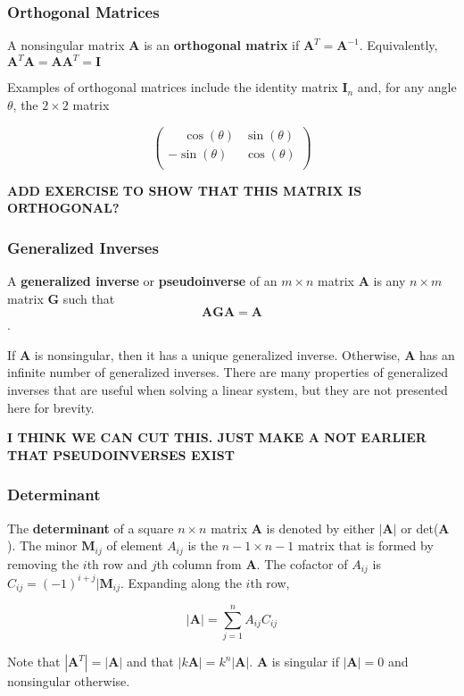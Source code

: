 \documentclass{beamer}
\begin{document}
\begin{frame}
\frametitle{Orthogonal Matrices}
A nonsingular matrix $\mathbf{A}$ is an \textbf{orthogonal matrix} if $\mathbf{A}^T = \mathbf{A}^{-1}$.  Equivalently, $\mathbf{A}^T\mathbf{A} = \mathbf{AA}^T = \mathbf{I}$   

\vspace{5mm}

Examples of orthogonal matrices include the identity matrix $\mathbf{I}_n$ and, for any angle $\theta$, the $2 \times 2$ matrix

\[
 \begin{pmatrix}
    \phantom{-}\cos (\theta) & \sin (\theta) \\
    -\sin (\theta) & \cos (\theta)  \\  
\end{pmatrix}
\]

\textbf{ADD EXERCISE TO SHOW THAT THIS MATRIX IS ORTHOGONAL?}

\end{frame}

\begin{frame}
\frametitle{Generalized Inverses}
A \textbf{generalized inverse} or \textbf{pseudoinverse} of an $m \times n$ matrix $\mathbf{A}$ is any $n \times m$ matrix $\mathbf{G}$ such that $$\mathbf{AGA} = \mathbf{A}$$.  

If $\mathbf{A}$ is nonsingular, then it has a unique generalized inverse.  Otherwise, $\mathbf{A}$ has an infinite number of generalized inverses.  There are many properties of generalized inverses that are useful when solving a linear system, but they are not presented here for brevity. 

\textbf{I THINK WE CAN CUT THIS. JUST MAKE A NOT EARLIER THAT PSEUDOINVERSES EXIST}

\end{frame}

\begin{frame}
\frametitle{Determinant}
The \textbf{determinant} of a square $n \times n$ matrix $\mathbf{A}$ is denoted by either $|\mathbf{A}|$ or det($\mathbf{A}$).  The minor $\mathbf{M}_{ij}$ of element $A_{ij}$ is the $n - 1 \times n-1$ matrix that is formed by removing the $i$th row and $j$th column from $\mathbf{A}$.  The cofactor of $A_{ij}$ is $C_{ij} = (-1)^{i + j}|\mathbf{M}_{ij}$.  Expanding along the $i$th row, 

$$|\mathbf{A}| = \sum_{j = 1}^n A_{ij}C_{ij}$$

Note that $|\mathbf{A}^T| = |\mathbf{A}|$ and that $|k\mathbf{A}| = k^n|\mathbf{A}|$.  $\mathbf{A}$ is singular if $|\mathbf{A}| = 0$ and nonsingular otherwise.
\end{frame}
\end{document}

